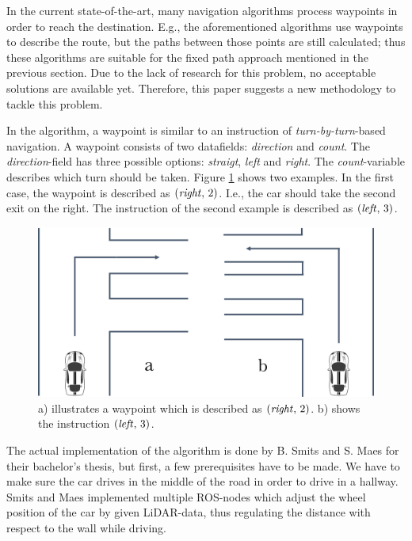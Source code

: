 \documentclass[conference,a4paper]{IEEEtran}
\begin{document}
In the current state-of-the-art, many navigation algorithms process waypoints in order to reach the destination. E.g., the aforementioned algorithms \cite{Henson2008}\cite{Theodosis2014} use waypoints to describe the route, but the paths between those points are still calculated; thus these algorithms are suitable for the fixed path approach mentioned in the previous section. Due to the lack of research for this problem, no acceptable solutions are available yet. Therefore, this paper suggests a new methodology to tackle this problem.

In the algorithm, a waypoint is similar to an instruction of  \emph{turn-by-turn}-based navigation. A waypoint consists of two datafields: \emph{direction} and \emph{count}.
The \emph{direction}-field has three possible options: \emph{straigt}, \emph{left} and \emph{right}. The \emph{count}-variable describes which turn should be taken. Figure \ref{fig:waypoints_turns} shows two examples. In the first case, the waypoint is described as $(\text{\emph{right}},\,2)$. I.e., the car should take the second exit on the right. The instruction of the second example is described as $(\text{\emph{left}},\,3)$. 

\begin{figure}[!t]
	\includegraphics[width=\columnwidth]{waypoints_turns}
	\centering
	\caption{a) illustrates a waypoint which is described as $(\text{\emph{right}},\,2)$. b) shows the instruction $(\text{\emph{left}},\,3)$. }
	\label{fig:waypoints_turns}
\end{figure}

The actual implementation of the algorithm is done by B. Smits and S. Maes for their bachelor's thesis, but first, a few prerequisites have to be made. We have to make sure the car drives in the middle of the road in order to drive in a hallway. Smits and Maes implemented multiple ROS-nodes which adjust the wheel position of the car by given LiDAR-data, thus regulating the distance with respect to the wall while driving. 
\end{document}
